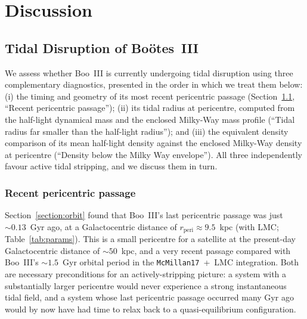 \documentclass[twocolumn]{aastex631}
\begin{document}
\section{Discussion} \label{section:discussion}
\subsection{Tidal Disruption of Boötes~III} \label{section:tidaldisrupt}


We assess whether Boo~III is currently undergoing tidal disruption using three complementary diagnostics, presented in the order in which we treat them below: (i) the timing and geometry of its most recent pericentric passage (Section~\ref{section:tidaldisrupt}, ``Recent pericentric passage''); (ii) its tidal radius at pericentre, computed from the half-light dynamical mass and the enclosed Milky-Way mass profile (``Tidal radius far smaller than the half-light radius''); and (iii) the equivalent density comparison of its mean half-light density against the enclosed Milky-Way density at pericentre (``Density below the Milky Way envelope''). All three independently favour active tidal stripping, and we discuss them in turn.

\subsubsection{Recent pericentric passage} Section~\ref{section:orbit} found that Boo~III's last pericentric passage was just $\sim 0.13$~Gyr ago, at a Galactocentric distance of $r_{\mathrm{peri}} \approx 9.5$~kpc (with LMC; Table~\ref{tab:params}).  This is a small pericentre for a satellite at the present-day Galactocentric distance of $\sim 50$~kpc, and a very recent passage compared with Boo~III's $\sim 1.5$~Gyr orbital period in the \texttt{McMillan17}~+~LMC integration. Both are necessary preconditions for an actively-stripping picture: a system with a substantially larger pericentre would never experience a strong instantaneous tidal field, and a system whose last pericentric passage occurred many Gyr ago would by now have had time to relax back to a quasi-equilibrium configuration.
\end{document}
